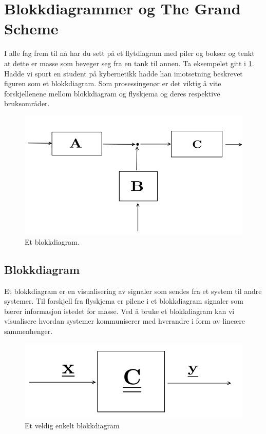 \clearpage
\section{Blokkdiagrammer og The Grand Scheme}\label{sec:signal_block_diagram}
I alle fag frem til nå har du sett på et flytdiagram med piler og bokser og tenkt at dette er masse som beveger seg fra en tank til annen. Ta eksempelet gitt i \cref{fig:simple_blockdiagram}. Hadde vi spurt en student på kybernetikk hadde han imotsetning beskrevet figuren som et blokkdiagram. Som prosessingenør er det viktig å vite forskjellenene mellom blokkdiagram og flyskjema og deres respektive bruksområder.

\begin{figure}[H]
    \centering
    \includegraphics[scale=0.5]{Figures/simple_blockdiagram1.png}
    \caption{Et blokkdiagram.}
    \label{fig:simple_blockdiagram}
\end{figure}

\subsection{Blokkdiagram}
Et blokkdiagram er en visualisering av signaler som sendes fra et system til andre systemer. Til forskjell fra flyskjema er pilene i et blokkdiagram signaler som bærer informasjon istedet for masse. Ved å bruke et blokkdiagram kan vi visualisere hvordan systemer kommuniserer med hverandre i form av lineære sammenhenger.

\begin{figure}[H]
    \centering
    \includegraphics[scale=0.5]{Figures/very_simple_blockdiagram.png}
    \caption{Et veldig enkelt blokkdiagram}
    \label{fig:very_simple_blockdiagram}
\end{figure}

